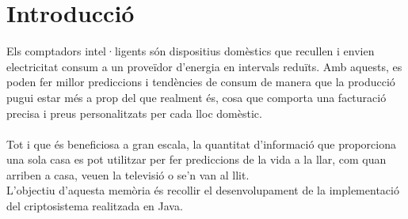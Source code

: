 \documentclass{article}
\begin{document}
\section{Introducció}
Els comptadors intel·ligents són dispositius domèstics que recullen i envien electricitat
consum a un proveïdor d’energia en intervals reduïts. Amb aquests,
es poden fer millor prediccions i tendències de consum de manera que la producció pugui estar més a prop del que realment és, cosa que comporta una facturació precisa i preus personalitzats per cada lloc domèstic.
\\
\\
Tot i que és beneficiosa a gran escala, la quantitat d'informació que proporciona una sola casa es pot utilitzar per fer prediccions de la vida a la llar, com quan arriben a casa, veuen la televisió o se'n van al llit.
\\
L'objectiu d'aquesta memòria és recollir el desenvolupament de la implementació del criptosistema realitzada en Java.
\end{document}

